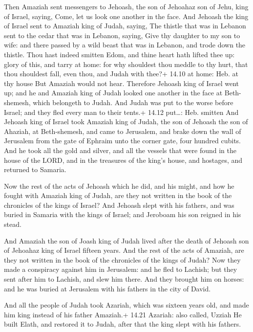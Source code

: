  Then Amaziah sent messengers to Jehoash, the son of
Jehoahaz son of Jehu, king of Israel, saying, Come, let us look one
another in the face.  And Jehoash the king of Israel sent to
Amaziah king of Judah, saying, The thistle that was in Lebanon sent to
the cedar that was in Lebanon, saying, Give thy daughter to my son to
wife: and there passed by a wild beast that was in Lebanon, and trode
down the thistle.  Thou hast indeed smitten Edom, and thine
heart hath lifted thee up: glory of this, and tarry at home: for why
shouldest thou meddle to thy hurt, that thou shouldest fall, even thou,
and Judah with thee?+ 14.10 at home: Heb. at thy house  But
Amaziah would not hear. Therefore Jehoash king of Israel went up; and he
and Amaziah king of Judah looked one another in the face at
Beth-shemesh, which belongeth to Judah.  And Judah was put
to the worse before Israel; and they fled every man to their tents.+
14.12 put\ldots: Heb. smitten  And Jehoash king of Israel
took Amaziah king of Judah, the son of Jehoash the son of Ahaziah, at
Beth-shemesh, and came to Jerusalem, and brake down the wall of
Jerusalem from the gate of Ephraim unto the corner gate, four hundred
cubits.  And he took all the gold and silver, and all the
vessels that were found in the house of the LORD, and in the treasures
of the king's house, and hostages, and returned to Samaria.

 Now the rest of the acts of Jehoash which he did, and
his might, and how he fought with Amaziah king of Judah, are they not
written in the book of the chronicles of the kings of Israel?
 And Jehoash slept with his fathers, and was buried in
Samaria with the kings of Israel; and Jeroboam his son reigned in his
stead.

 And Amaziah the son of Joash king of Judah lived after
the death of Jehoash son of Jehoahaz king of Israel fifteen years.
 And the rest of the acts of Amaziah, are they not written
in the book of the chronicles of the kings of Judah?  Now
they made a conspiracy against him in Jerusalem: and he fled to Lachish;
but they sent after him to Lachish, and slew him there. 
And they brought him on horses: and he was buried at Jerusalem with his
fathers in the city of David.

 And all the people of Judah took Azariah, which was
sixteen years old, and made him king instead of his father Amaziah.+
14.21 Azariah: also called, Uzziah  He built Elath, and
restored it to Judah, after that the king slept with his fathers.

